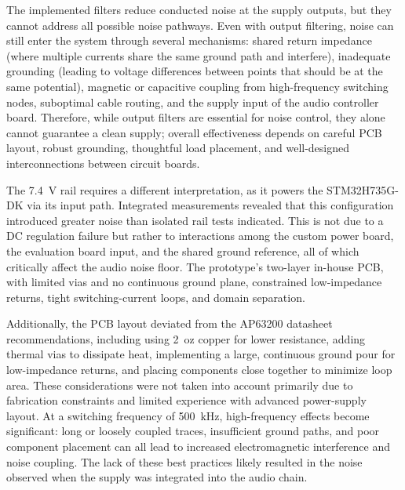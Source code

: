 The implemented filters reduce conducted noise at the supply outputs, but they cannot address all possible noise pathways. Even with output filtering, noise can still enter the system through several mechanisms: shared return impedance (where multiple currents share the same ground path and interfere), inadequate grounding (leading to voltage differences between points that should be at the same potential), magnetic or capacitive coupling from high-frequency switching nodes, suboptimal cable routing, and the supply input of the audio controller board. Therefore, while output filters are essential for noise control, they alone cannot guarantee a clean supply; overall effectiveness depends on careful PCB layout, robust grounding, thoughtful load placement, and well-designed interconnections between circuit boards.

The 7.4~V rail requires a different interpretation, as it powers the STM32H735G-DK via its input path. Integrated measurements revealed that this configuration introduced greater noise than isolated rail tests indicated. This is not due to a DC regulation failure but rather to interactions among the custom power board, the evaluation board input, and the shared ground reference, all of which critically affect the audio noise floor. The prototype’s two-layer in-house PCB, with limited vias and no continuous ground plane, constrained low-impedance returns, tight switching-current loops, and domain separation. 

Additionally, the PCB layout deviated from the AP63200 datasheet recommendations, including using 2~oz copper for lower resistance, adding thermal vias to dissipate heat, implementing a large, continuous ground pour for low-impedance returns, and placing components close together to minimize loop area. These considerations were not taken into account primarily due to fabrication constraints and limited experience with advanced power-supply layout. At a switching frequency of \SI{500}{\kilo\hertz}, high-frequency effects become significant: long or loosely coupled traces, insufficient ground paths, and poor component placement can all lead to increased electromagnetic interference and noise coupling. The lack of these best practices likely resulted in the noise observed when the supply was integrated into the audio chain.

